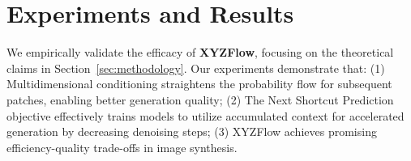 \documentclass{article}
\theoremstyle{plain}
\theoremstyle{definition}
\theoremstyle{remark}
\begin{document}
\vspace{-4mm}
\section{Experiments and Results}
\label{sec:experiments}
\vspace{-2mm}

We empirically validate the efficacy of \textbf{XYZFlow}, focusing on the theoretical claims in Section~\ref{sec:methodology}. Our experiments demonstrate that: (1) Multidimensional conditioning straightens the probability flow for subsequent patches, enabling better generation  quality; (2) The Next Shortcut Prediction objective effectively trains models to utilize accumulated context for accelerated generation by decreasing denoising steps; (3) XYZFlow achieves promising efficiency-quality trade-offs in image synthesis. 


        

        
        
        
\end{document}
